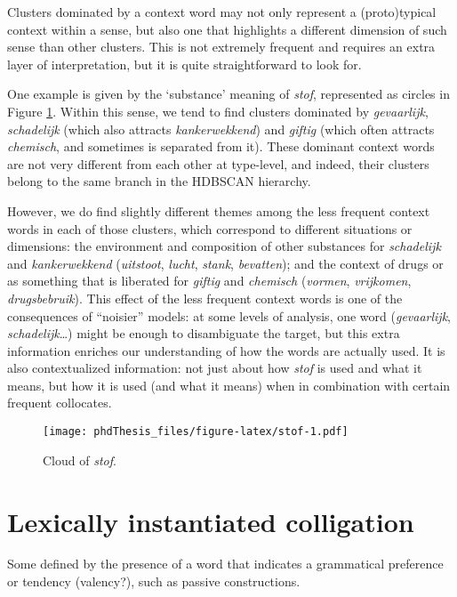 \documentclass[
]{book}
\begin{document}
Clusters dominated by a context word may not only represent a (proto)typical context within a sense, but also one that highlights a different dimension of such sense than other clusters. This is not extremely frequent and requires an extra layer of interpretation, but it is quite straightforward to look for.

One example is given by the `substance' meaning of \emph{stof}, represented as circles in Figure \ref{fig:stof}.
Within this sense, we tend to find clusters dominated by \emph{gevaarlijk}, \emph{schadelijk} (which also attracts \emph{kankerwekkend}) and \emph{giftig} (which often attracts \emph{chemisch}, and sometimes is separated from it). These dominant context words are not very different from each other at type-level, and indeed, their clusters belong to the same branch in the HDBSCAN hierarchy.

However, we do find slightly different themes among the less frequent context words in each of those clusters, which correspond to different situations or dimensions: the environment and composition of other substances for \emph{schadelijk} and \emph{kankerwekkend} (\emph{uitstoot}, \emph{lucht}, \emph{stank}, \emph{bevatten}); and the context of drugs or as something that is liberated for \emph{giftig} and \emph{chemisch} (\emph{vormen}, \emph{vrijkomen}, \emph{drugsbebruik}).
This effect of the less frequent context words is one of the consequences of ``noisier'' models: at some levels of analysis, one word (\emph{gevaarlijk}, \emph{schadelijk}\ldots) might be enough to disambiguate the target, but this extra information enriches our understanding of how the words are actually used. It is also contextualized information: not just about how \emph{stof} is used and what it means, but how it is used (and what it means) when in combination with certain frequent collocates.



\begin{figure}
\centering
\texttt{[image: phdThesis\_files/figure-latex/stof-1.pdf]}
\caption{\label{fig:stof}Cloud of \emph{stof}.}
\end{figure}

\hypertarget{lexically-instantiated-colligation}{%
\section{Lexically instantiated colligation}\label{lexically-instantiated-colligation}}

Some defined by the presence of a word that indicates a grammatical preference or tendency (valency?), such as passive constructions.
\end{document}
